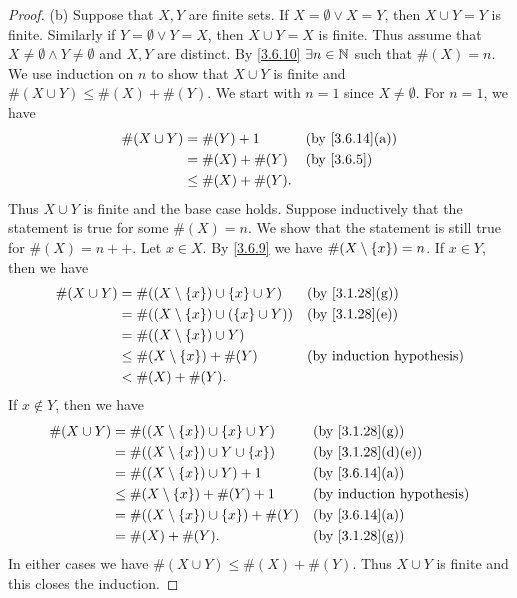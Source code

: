 \begin{proof}{(b)}
  Suppose that \(X, Y\) are finite sets.
  If \(X = \emptyset \lor X = Y\), then \(X \cup Y = Y\) is finite.
  Similarly if \(Y = \emptyset \lor Y = X\), then \(X \cup Y = X\) is finite.
  Thus assume that \(X \neq \emptyset \land Y \neq \emptyset\) and \(X, Y\) are distinct.
  By \cref{3.6.10} \(\exists n \in \mathbb{N}\) such that \(\#(X) = n\).
  We use induction on \(n\) to show that \(X \cup Y\) is finite and \(\#(X \cup Y) \leq \#(X) + \#(Y)\).
  We start with \(n = 1\) since \(X \neq \emptyset\).
  For \(n = 1\), we have
  \begin{align*}
    \#(X \cup Y) & = \#(Y) + 1         &  & \text{(by \cref{3.6.14}(a))} \\
                 & = \#(X) + \#(Y)     &  & \by{3.6.5}                   \\
                 & \leq \#(X) + \#(Y).
  \end{align*}
  Thus \(X \cup Y\) is finite and the base case holds.
  Suppose inductively that the statement is true for some \(\#(X) = n\).
  We show that the statement is still true for \(\#(X) = n++\).
  Let \(x \in X\).
  By \cref{3.6.9} we have \(\#(X \setminus \left\lbrace x\right\rbrace) = n\).
  If \(x \in Y\), then we have
  \begin{align*}
    \#(X \cup Y) & = \#((X \setminus \set{x}) \cup \set{x} \cup Y)   &  & \text{(by \cref{3.1.28}(g))} \\
                 & = \#((X \setminus \set{x}) \cup (\set{x} \cup Y)) &  & \text{(by \cref{3.1.28}(e))} \\
                 & = \#((X \setminus \set{x}) \cup Y)                                                  \\
                 & \leq \#(X \setminus \set{x}) + \#(Y)              &  & \byIH                        \\
                 & < \#(X) + \#(Y).
  \end{align*}
  If \(x \notin Y\), then we have
  \begin{align*}
    \#(X \cup Y) & = \#((X \setminus \set{x}) \cup \set{x} \cup Y)  &  & \text{(by \cref{3.1.28}(g))}    \\
                 & = \#((X \setminus \set{x}) \cup Y \cup \set{x})  &  & \text{(by \cref{3.1.28}(d)(e))} \\
                 & = \#((X \setminus \set{x}) \cup Y) + 1           &  & \text{(by \cref{3.6.14}(a))}    \\
                 & \leq \#(X \setminus \set{x}) + \#(Y) + 1         &  & \byIH                           \\
                 & = \#((X \setminus \set{x}) \cup \set{x}) + \#(Y) &  & \text{(by \cref{3.6.14}(a))}    \\
                 & = \#(X) + \#(Y).                                 &  & \text{(by \cref{3.1.28}(g))}
  \end{align*}
  In either cases we have \(\#(X \cup Y) \leq \#(X) + \#(Y)\).
  Thus \(X \cup Y\) is finite and this closes the induction.


\end{proof}
